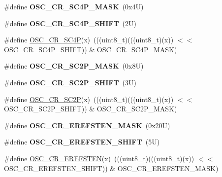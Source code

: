 \begin{DoxyCompactItemize}
\#define {\bfseries O\+S\+C\+\_\+\+C\+R\+\_\+\+S\+C4\+P\+\_\+\+M\+A\+SK}~(0x4\+U)
\item 
\mbox{\label{group___o_s_c___register___masks_gab1724a5b1e96efb22e48a9478ae8cf25}} 
\#define {\bfseries O\+S\+C\+\_\+\+C\+R\+\_\+\+S\+C4\+P\+\_\+\+S\+H\+I\+FT}~(2\+U)
\item 
\#define \mbox{\hyperlink{group___o_s_c___register___masks_gac2ce9a5b1c516b1416ee3709d405e4e2}{O\+S\+C\+\_\+\+C\+R\+\_\+\+S\+C4P}}(x)~(((uint8\+\_\+t)(((uint8\+\_\+t)(x)) $<$$<$ O\+S\+C\+\_\+\+C\+R\+\_\+\+S\+C4\+P\+\_\+\+S\+H\+I\+FT)) \& O\+S\+C\+\_\+\+C\+R\+\_\+\+S\+C4\+P\+\_\+\+M\+A\+SK)
\item 
\mbox{\label{group___o_s_c___register___masks_ga94a8b0e48d18793bde1a3aaaea44b92c}} 
\#define {\bfseries O\+S\+C\+\_\+\+C\+R\+\_\+\+S\+C2\+P\+\_\+\+M\+A\+SK}~(0x8\+U)
\item 
\mbox{\label{group___o_s_c___register___masks_ga0ec9adaf1ca3ec309f1a2c2fd37d3f4d}} 
\#define {\bfseries O\+S\+C\+\_\+\+C\+R\+\_\+\+S\+C2\+P\+\_\+\+S\+H\+I\+FT}~(3\+U)
\item 
\#define \mbox{\hyperlink{group___o_s_c___register___masks_gadac6841e6bd13c6bc6e6d4caecf86a16}{O\+S\+C\+\_\+\+C\+R\+\_\+\+S\+C2P}}(x)~(((uint8\+\_\+t)(((uint8\+\_\+t)(x)) $<$$<$ O\+S\+C\+\_\+\+C\+R\+\_\+\+S\+C2\+P\+\_\+\+S\+H\+I\+FT)) \& O\+S\+C\+\_\+\+C\+R\+\_\+\+S\+C2\+P\+\_\+\+M\+A\+SK)
\item 
\mbox{\label{group___o_s_c___register___masks_ga3024913f44011d333c6f48ddb00fbf9d}} 
\#define {\bfseries O\+S\+C\+\_\+\+C\+R\+\_\+\+E\+R\+E\+F\+S\+T\+E\+N\+\_\+\+M\+A\+SK}~(0x20\+U)
\item 
\mbox{\label{group___o_s_c___register___masks_gac1b9c5d7f156f1792255204dae816aba}} 
\#define {\bfseries O\+S\+C\+\_\+\+C\+R\+\_\+\+E\+R\+E\+F\+S\+T\+E\+N\+\_\+\+S\+H\+I\+FT}~(5\+U)
\item 
\#define \mbox{\hyperlink{group___o_s_c___register___masks_ga7475d176c4bae67579b611847b67c53c}{O\+S\+C\+\_\+\+C\+R\+\_\+\+E\+R\+E\+F\+S\+T\+EN}}(x)~(((uint8\+\_\+t)(((uint8\+\_\+t)(x)) $<$$<$ O\+S\+C\+\_\+\+C\+R\+\_\+\+E\+R\+E\+F\+S\+T\+E\+N\+\_\+\+S\+H\+I\+FT)) \& O\+S\+C\+\_\+\+C\+R\+\_\+\+E\+R\+E\+F\+S\+T\+E\+N\+\_\+\+M\+A\+SK)
$$
\end{DoxyCompactItemize}
